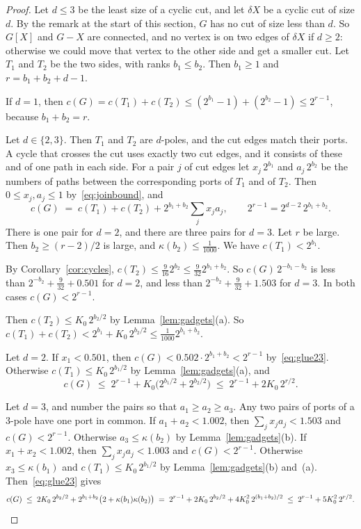\begin{proof}
Let $d\le3$ be the least size of a cyclic cut, and let $\delta X$ be a cyclic cut of size $d$. By
the remark at the start of this section, $G$ has no cut of size less than $d$. So $G[X]$ and
$G-X$ are connected, and no vertex is on two edges of $\delta X$ if $d\ge2$: otherwise we could
move that vertex to the other side and get a smaller cut. Let $T_1$ and $T_2$ be the two sides,
with ranks $b_1\le b_2$. Then $b_1\ge1$ and $r=b_1+b_2+d-1$.

If $d=1$, then $c(G)=c(T_1)+c(T_2)\le(2^{b_1}-1)+(2^{b_2}-1)\le2^{r-1}$, because $b_1+b_2=r$.

Let $d\in\{2,3\}$. Then $T_1$ and $T_2$ are $d$-poles, and the cut edges match their ports. A cycle
that crosses the cut uses exactly two cut edges, and it consists of these and of one path in each
side. For a pair $j$ of cut edges let $x_j\,2^{b_1}$ and $a_j\,2^{b_2}$ be the numbers of paths
between the corresponding ports of $T_1$ and of $T_2$. Then $0\le x_j,a_j\le1$
by~\eqref{eq:joinbound}, and
\begin{equation}\label{eq:glue23}
  c(G)\;=\;c(T_1)+c(T_2)+2^{b_1+b_2}\sum_jx_ja_j,
  \qquad 2^{r-1}=2^{d-2}\,2^{b_1+b_2}.
\end{equation}
There is one pair for $d=2$, and there are three pairs for $d=3$. Let $r$ be large. Then
$b_2\ge(r-2)/2$ is large, and $\kappa(b_2)\le\frac1{1000}$. We have $c(T_1)<2^{b_1}$.

 By Corollary~\ref{cor:cycles},
$c(T_2)\le\frac9{16}2^{b_2}\le\frac9{32}2^{b_1+b_2}$. So $c(G)\,2^{-b_1-b_2}$ is less than
$2^{-b_2}+\frac9{32}+0.501$ for $d=2$, and less than $2^{-b_2}+\frac9{32}+1.503$ for $d=3$. In
both cases $c(G)<2^{r-1}$.

 Then $c(T_2)\le K_0\,2^{b_2/2}$ by
Lemma~\ref{lem:gadgets}(a). So $c(T_1)+c(T_2)<2^{b_1}+K_0\,2^{b_2/2}\le\frac1{1000}2^{b_1+b_2}$.

Let $d=2$. If $x_1<0.501$, then $c(G)<0.502\cdot2^{b_1+b_2}<2^{r-1}$ by~\eqref{eq:glue23}.
Otherwise $c(T_1)\le K_0\,2^{b_1/2}$ by Lemma~\ref{lem:gadgets}(a), and
\[
  c(G)\;\le\;2^{r-1}+K_0\bigl(2^{b_1/2}+2^{b_2/2}\bigr)\;\le\;2^{r-1}+2K_0\,2^{r/2}.
\]

Let $d=3$, and number the pairs so that $a_1\ge a_2\ge a_3$. Any two pairs of ports of a $3$-pole
have one port in common. If $a_1+a_2<1.002$, then $\sum_jx_ja_j<1.503$ and $c(G)<2^{r-1}$.
Otherwise $a_3\le\kappa(b_2)$ by Lemma~\ref{lem:gadgets}(b). If $x_1+x_2<1.002$, then
$\sum_jx_ja_j<1.003$ and $c(G)<2^{r-1}$. Otherwise $x_3\le\kappa(b_1)$ and
$c(T_1)\le K_0\,2^{b_1/2}$ by Lemma~\ref{lem:gadgets}(b) and~(a). Then~\eqref{eq:glue23} gives
\[
  c(G)\;\le\;2K_0\,2^{b_2/2}+2^{b_1+b_2}\bigl(2+\kappa(b_1)\kappa(b_2)\bigr)
  \;=\;2^{r-1}+2K_0\,2^{b_2/2}+4K_0^{2}\,2^{(b_1+b_2)/2}
  \;\le\;2^{r-1}+5K_0^{2}\,2^{r/2}.\qedhere
\]
\end{proof}

